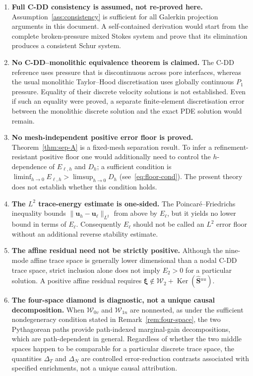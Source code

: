 \documentclass[11pt,a4paper]{article}
\theoremstyle{definition}
\newcommand{\vel}{\bm{u}}
\newcommand{\Schur}{\mathbf{S}}
\newcommand{\Shatuu}{\widehat{\Schur}{}^{uu}}
\newcommand{\Ker}{\operatorname{Ker}}
\newcommand{\Wspace}{\mathcal{W}}
\begin{document}
\begin{enumerate}[leftmargin=*,itemsep=4pt]
  \item \textbf{Full C-DD consistency is assumed, not re-proved here.}
    Assumption~\ref{ass:consistency} is sufficient for all Galerkin
    projection arguments in this document.  A self-contained derivation
    would start from the complete broken-pressure mixed Stokes system
    and prove that its elimination produces a consistent Schur system.

  \item \textbf{No C-DD--monolithic equivalence theorem is claimed.}
    The C-DD reference uses pressure that is discontinuous across pore
    interfaces, whereas the usual monolithic Taylor--Hood discretisation
    uses globally continuous $P_1$ pressure.  Equality of their discrete
    velocity solutions is not established.  Even if such an equality
    were proved, a separate finite-element discretisation error between
    the monolithic discrete solution and the exact PDE solution would
    remain.

  \item \textbf{No mesh-independent positive error floor is proved.}
    Theorem~\ref{thm:sep-A} is a fixed-mesh separation result.  To infer
    a refinement-resistant positive floor one would additionally need
    to control the $h$-dependence of $E_{\ell,h}$ and $D_h$; a sufficient
    condition is $\liminf_{h\to0}E_{\ell,h} > \limsup_{h\to0}D_h$
    (see~\eqref{eq:floor-cond}).  The present theory does not establish
    whether this condition holds.

  \item \textbf{The $L^2$ trace-energy estimate is one-sided.}
    The Poincar\'e--Friedrichs inequality bounds
    $\|\vel_h-\vel_\ell\|_{L^2}$ from above by $E_\ell$, but it yields no
    lower bound in terms of $E_\ell$.  Consequently $E_\ell$ should not
    be called an $L^2$ error floor without an additional reverse
    stability estimate.

  \item \textbf{The affine residual need not be strictly positive.}
    Although the nine-mode affine trace space is generally lower
    dimensional than a nodal C-DD trace space, strict inclusion alone
    does not imply $E_2>0$ for a particular solution.  A positive
    affine residual requires
    $\bm{\xi}\notin\Wspace_2+\Ker(\Shatuu)$.

  \item \textbf{The four-space diamond is diagnostic, not a unique
    causal decomposition.}
    When $\Wspace_{0v}$ and $\Wspace_{1n}$ are nonnested, as under the
    sufficient nondegeneracy condition stated in
    Remark~\ref{rem:four-space}, the two Pythagorean paths provide
    path-indexed marginal-gain decompositions, which are path-dependent
    in general.  Regardless of whether the two middle spaces happen to
    be comparable for a particular discrete trace space, the quantities
    $\Delta_T$ and $\Delta_N$ are controlled error-reduction contrasts
    associated with specified enrichments, not a unique causal
    attribution.


\end{enumerate}
\end{document}
